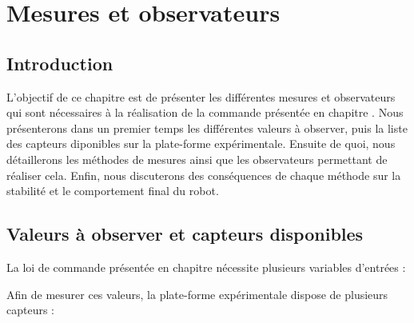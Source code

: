 \chapter{Mesures et observateurs}
	\section{Introduction}
	
		L'objectif de ce chapitre est de présenter les différentes mesures et observateurs qui sont nécessaires à la réalisation de la commande présentée en chapitre .
		Nous présenterons dans un premier temps les différentes valeurs à observer, puis la liste des capteurs diponibles sur la plate-forme expérimentale.
		Ensuite de quoi, nous détaillerons les méthodes de mesures ainsi que les observateurs permettant de réaliser cela. 
		Enfin, nous discuterons des conséquences de chaque méthode sur la stabilité et le comportement final du robot.
	
	\section{Valeurs à observer et capteurs disponibles}
	
		La loi de commande présentée en chapitre  nécessite plusieurs variables d'entrées :
		
		Afin de mesurer ces valeurs, la plate-forme expérimentale dispose de plusieurs capteurs :
		
